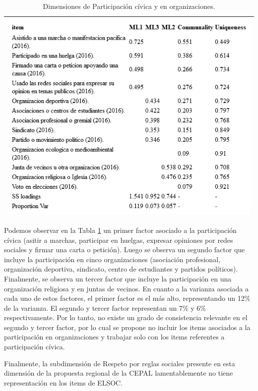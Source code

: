 \documentclass[
  12pt,
]{book}
\begin{document}
\begin{longtable}[]{@{}l@{}}
\caption{\label{tab:participacion-fa}Dimensiones de Participación cívica y en organizaciones.}\tabularnewline
\toprule
\endhead
\includegraphics[width=8.33333in,height=\textheight]{output/tables/participacion_fa.png}\tabularnewline
\bottomrule
\end{longtable}

Podemos observar en la Tabla \ref{tab:participacion-fa} un primer factor asociado a la participación cívica (asitir a marchas, participar en huelgas, expresar opiniones por redes sociales y firmar una carta o petición). Luego se observa un segundo factor que incluye la participación en cinco organizaciones (asociación profesional, organización deportiva, sindicato, centro de estudiantes y partidos políticos). Finalmente, se observa un tercer factor que incluye la participación en una organización religiosa y en juntas de vecinos. En cuanto a la varianza asociada a cada uno de estos factores, el primer factor es el más alto, representando un 12\% de la varianza. El segundo y tercer factor representan un 7\% y 6\% respectivamente. Por lo tanto, no existe un grado de consistencia relevante en el segundo y tercer factor, por lo cual se propone no incluir los items asociados a la participación en organizaciones y trabajar solo con los items referentes a participación cívica.

Finalmente, la subdimensión de Respeto por reglas sociales presente en esta dimensión de la propuesta regional de la CEPAL lamentablemente no tiene representación en los items de ELSOC.
\end{document}
